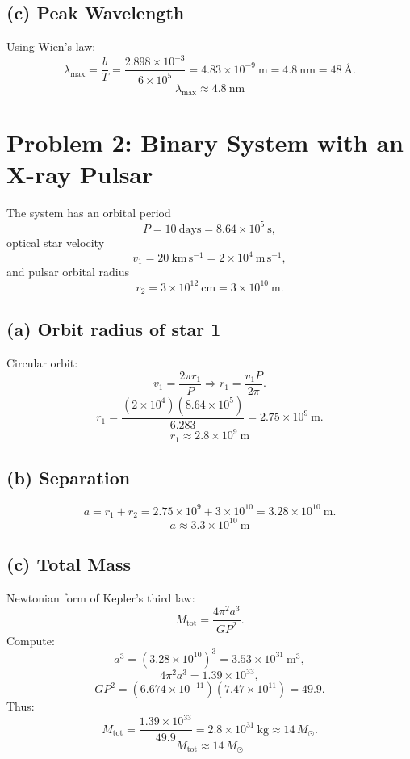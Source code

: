 \documentclass[12pt]{article}
\begin{document}
\subsection*{(c) Peak Wavelength}

Using Wien's law:
\[
\lambda_{\max} = \frac{b}{T}
= \frac{2.898\times 10^{-3}}{6\times 10^{5}}
= 4.83\times 10^{-9}~\mathrm{m}
= 4.8~\mathrm{nm}
= 48~\text{\AA}.
\]
\[
\boxed{\lambda_{\max} \approx 4.8~\mathrm{nm}}
\]

\section*{Problem 2: Binary System with an X-ray Pulsar}

The system has an orbital period
\[
P = 10~\mathrm{days} = 8.64\times 10^{5}~\mathrm{s},
\]
optical star velocity
\[
v_{1} = 20~\mathrm{km\,s^{-1}} = 2\times 10^{4}~\mathrm{m\,s^{-1}},
\]
and pulsar orbital radius
\[
r_{2} = 3\times 10^{12}~\mathrm{cm} = 3\times 10^{10}~\mathrm{m}.
\]

\subsection*{(a) Orbit radius of star 1}

Circular orbit:
\[
v_{1} = \frac{2\pi r_{1}}{P}
\Rightarrow
r_{1} = \frac{v_{1}P}{2\pi}.
\]
\[
r_{1} = \frac{(2\times 10^{4})(8.64\times 10^{5})}{6.283}
      = 2.75\times 10^{9}~\mathrm{m}.
\]
\[
\boxed{r_{1} \approx 2.8\times 10^{9}~\mathrm{m}}
\]

\subsection*{(b) Separation}

\[
a = r_{1} + r_{2}
= 2.75\times 10^{9} + 3\times 10^{10}
= 3.28\times 10^{10}~\mathrm{m}.
\]
\[
\boxed{a \approx 3.3\times 10^{10}~\mathrm{m}}
\]

\subsection*{(c) Total Mass}

Newtonian form of Kepler’s third law:
\[
M_{\mathrm{tot}} = \frac{4\pi^{2}a^{3}}{GP^{2}}.
\]
Compute:
\[
a^{3} = (3.28\times 10^{10})^{3}
      = 3.53\times 10^{31}~\mathrm{m^{3}},
\]
\[
4\pi^{2}a^{3}
= 1.39\times 10^{33},
\]
\[
GP^{2}
= (6.674\times 10^{-11})(7.47\times 10^{11})
= 49.9.
\]
Thus:
\[
M_{\mathrm{tot}}
= \frac{1.39\times 10^{33}}{49.9}
= 2.8\times 10^{31}~\mathrm{kg}
\approx 14\,M_{\odot}.
\]
\[
\boxed{M_{\mathrm{tot}} \approx 14\,M_{\odot}}
\]
\end{document}

